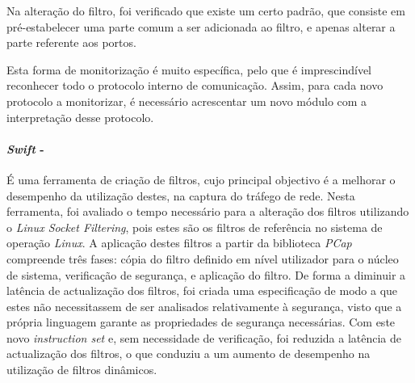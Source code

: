 Na alteração do filtro, foi verificado que existe um certo padrão, que consiste em pré-estabelecer uma parte comum a ser adicionada ao filtro, e apenas alterar a parte referente aos portos.

Esta forma de monitorização é muito específica, pelo que é imprescindível reconhecer todo o protocolo interno de comunicação.
Assim, para cada novo protocolo a monitorizar, é necessário acrescentar um novo módulo com a interpretação desse protocolo.


\paragraph*{\textit{Swift} - }
É uma ferramenta de criação de filtros, cujo principal objectivo é a melhorar o desempenho da utilização destes, na captura do tráfego de rede.
Nesta ferramenta, foi avaliado o tempo necessário para a alteração dos filtros utilizando o \textit{Linux Socket Filtering}, pois estes são os filtros de referência no sistema de operação \textit{Linux}.
A aplicação destes filtros a partir da biblioteca \textit{PCap} compreende três fases: cópia do filtro definido em nível utilizador para o núcleo de sistema, verificação de segurança, e aplicação do filtro.
De forma a diminuir a latência de actualização dos filtros, foi criada uma especificação de modo a que estes não necessitassem de ser analisados relativamente à segurança, visto que a própria linguagem garante as propriedades de segurança necessárias.
Com este novo \textit{instruction set} e, sem necessidade de verificação, foi reduzida a latência de actualização dos filtros, o que conduziu a um aumento de desempenho na utilização de filtros dinâmicos.








